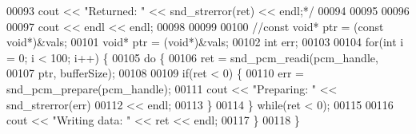 \begin{DoxyCode}
00093 \textcolor{comment}{    cout << "Returned: " << snd\_strerror(ret) << endl;*/}
00094 
00095     
00096 
00097     cout << endl << endl;
00098 
00099 
00100     \textcolor{comment}{//const void* ptr = (const void*)&vals;}
00101     \textcolor{keywordtype}{void}* ptr = (\textcolor{keywordtype}{void}*)&vals;
00102     \textcolor{keywordtype}{int} err;
00103 
00104     \textcolor{keywordflow}{for}(\textcolor{keywordtype}{int} i = 0; i < 100; i++) \{
00105         \textcolor{keywordflow}{do} \{
00106             ret = snd\_pcm\_readi(pcm\_handle,
00107                     ptr, bufferSize);
00108 
00109             \textcolor{keywordflow}{if}(ret < 0) \{
00110                 err = snd\_pcm\_prepare(pcm\_handle);
00111                 cout << \textcolor{stringliteral}{"Preparing: "} << snd\_strerror(err)
00112                     << endl;
00113             \}
00114         \} \textcolor{keywordflow}{while}(ret < 0);
00115 
00116         cout << \textcolor{stringliteral}{"Writing data: "} << ret << endl;
00117     \}
00118 \}
\end{DoxyCode}
